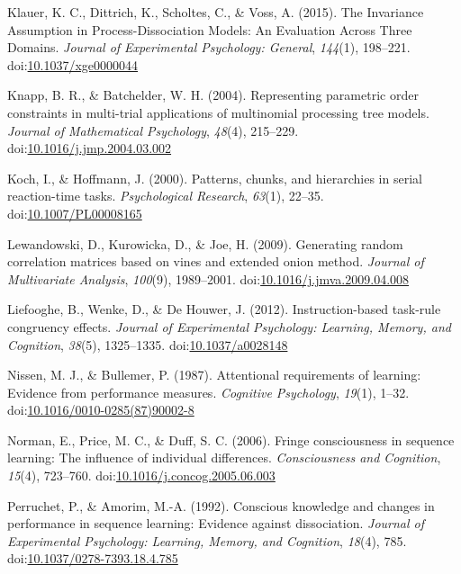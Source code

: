 \documentclass[floatsintext,doc]{apa6}
\theoremstyle{definition}
\theoremstyle{definition}
\theoremstyle{definition}
\theoremstyle{remark}
\begin{document}
\hypertarget{ref-klauer_invariance_2015}{}
Klauer, K. C., Dittrich, K., Scholtes, C., \& Voss, A. (2015). The
Invariance Assumption in Process-Dissociation Models: An Evaluation
Across Three Domains. \emph{Journal of Experimental Psychology:
General}, \emph{144}(1), 198--221.
doi:\href{https://doi.org/10.1037/xge0000044}{10.1037/xge0000044}

\hypertarget{ref-knapp_representing_2004}{}
Knapp, B. R., \& Batchelder, W. H. (2004). Representing parametric order
constraints in multi-trial applications of multinomial processing tree
models. \emph{Journal of Mathematical Psychology}, \emph{48}(4),
215--229.
doi:\href{https://doi.org/10.1016/j.jmp.2004.03.002}{10.1016/j.jmp.2004.03.002}

\hypertarget{ref-koch_patterns_2000}{}
Koch, I., \& Hoffmann, J. (2000). Patterns, chunks, and hierarchies in
serial reaction-time tasks. \emph{Psychological Research}, \emph{63}(1),
22--35.
doi:\href{https://doi.org/10.1007/PL00008165}{10.1007/PL00008165}

\hypertarget{ref-lewandowski_generating_2009}{}
Lewandowski, D., Kurowicka, D., \& Joe, H. (2009). Generating random
correlation matrices based on vines and extended onion method.
\emph{Journal of Multivariate Analysis}, \emph{100}(9), 1989--2001.
doi:\href{https://doi.org/10.1016/j.jmva.2009.04.008}{10.1016/j.jmva.2009.04.008}

\hypertarget{ref-liefooghe_instruction-based_2012}{}
Liefooghe, B., Wenke, D., \& De Houwer, J. (2012). Instruction-based
task-rule congruency effects. \emph{Journal of Experimental Psychology:
Learning, Memory, and Cognition}, \emph{38}(5), 1325--1335.
doi:\href{https://doi.org/10.1037/a0028148}{10.1037/a0028148}

\hypertarget{ref-nissen_attentional_1987}{}
Nissen, M. J., \& Bullemer, P. (1987). Attentional requirements of
learning: Evidence from performance measures. \emph{Cognitive
Psychology}, \emph{19}(1), 1--32.
doi:\href{https://doi.org/10.1016/0010-0285(87)90002-8}{10.1016/0010-0285(87)90002-8}

\hypertarget{ref-norman_fringe_2006}{}
Norman, E., Price, M. C., \& Duff, S. C. (2006). Fringe consciousness in
sequence learning: The influence of individual differences.
\emph{Consciousness and Cognition}, \emph{15}(4), 723--760.
doi:\href{https://doi.org/10.1016/j.concog.2005.06.003}{10.1016/j.concog.2005.06.003}

\hypertarget{ref-perruchet_conscious_1992}{}
Perruchet, P., \& Amorim, M.-A. (1992). Conscious knowledge and changes
in performance in sequence learning: Evidence against dissociation.
\emph{Journal of Experimental Psychology: Learning, Memory, and
Cognition}, \emph{18}(4), 785.
doi:\href{https://doi.org/10.1037/0278-7393.18.4.785}{10.1037/0278-7393.18.4.785}
\end{document}
